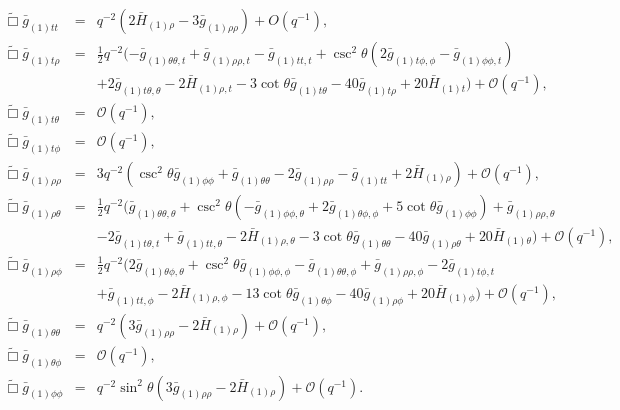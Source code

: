 \documentclass[aps,letterpaper,twocolumn,nofootinbib]{revtex4}
\numberwithin{equation}{section}
\begin{document}
\begin{widetext}
\begin{eqnarray}\label{eqn:efett_3p1}
\tilde{\Box}\bar{g}_{(1)tt}&=&q^{-2} \left(2 \bar{H}_{(1) \rho }-3 \bar{g}_{(1) \rho \rho }\right)+O\left(q^{-1}\right),\\
%
\label{eqn:efetrho_3p1}
\tilde{\Box}\bar{g}_{(1)t\rho}&=&\frac{1}{2}q^{-2} (-\bar{g}_{(1)\theta \theta,t}+\bar{g}_{(1) \rho \rho ,t}-\bar{g}_{(1)
  \text{$tt$},t}+\csc ^2\theta \left(2 \bar{g}_{(1) \text{$t$$\phi $},\phi }-\bar{g}_{(1)
  \phi \phi ,t}\right) \nonumber\\
   &&+2 \bar{g}_{(1) \text{$t$$\theta $},\theta }-2 \bar{H}_{(1) \rho ,t}-3
   \cot \theta  \bar{g}_{(1) \text{$t$$\theta $}}-40 \bar{g}_{(1) \text{$t$$\rho $}}+20
   \bar{H}_{(1) t}) +\mathcal{O}(q^{-1}),\\
%
\label{eqn:efettheta_3p1}
\tilde{\Box}\bar{g}_{(1)t\theta}&=&\mathcal{O}(q^{-1}),\\
%
\label{eqn:efetphi_3p1}
\tilde{\Box}\bar{g}_{(1)t\phi}&=&\mathcal{O}(q^{-1}),\\
%
\label{eqn:eferhorho_3p1}
\tilde{\Box}\bar{g}_{(1)\rho\rho}&=&3q^{-2} \left(\csc ^2\theta \bar{g}_{(1) \phi \phi }+\bar{g}_{(1)\theta \theta}-2 \bar{g}_{(1)
   \rho \rho }-\bar{g}_{(1) \text{$tt$}}+2 \bar{H}_{(1) \rho }\right)+\mathcal{O}(q^{-1}),\\
% 
\label{eqn:eferhotheta_3p1}
\tilde{\Box}\bar{g}_{(1)\rho\theta}&=&\frac{1}{2} q^{-2}(\bar{g}_{(1)\theta \theta,\theta }+\csc ^2\theta \left(-\bar{g}_{(1)
   \phi \phi ,\theta }+2 \bar{g}_{(1)\theta \phi,\phi }+5 \cot \theta  \bar{g}_{(1) \phi
   \phi }\right)+\bar{g}_{(1) \rho \rho ,\theta }\nonumber\\
   &&-2 \bar{g}_{(1) \text{$t$$\theta
   $},t}+\bar{g}_{(1) \text{$tt$},\theta }-2 \bar{H}_{(1) \rho ,\theta }-3 \cot \theta 
   \bar{g}_{(1)\theta \theta}-40 \bar{g}_{(1) \rho \theta }+20 \bar{H}_{(1)\theta})+\mathcal{O}(q^{-1}),\\
% 
\label{eqn:eferhophi_3p1}
\tilde{\Box}\bar{g}_{(1)\rho\phi}&=&\frac{1}{2} q^{-2}(2 \bar{g}_{(1)\theta \phi,\theta }+\csc ^2\theta \bar{g}_{(1) \phi
   \phi ,\phi }-\bar{g}_{(1)\theta \theta,\phi }+\bar{g}_{(1) \rho \rho ,\phi }-2
   \bar{g}_{(1) \text{$t$$\phi $},t}\nonumber\\
   &&+\bar{g}_{(1) \text{$tt$},\phi }-2 \bar{H}_{(1) \rho ,\phi }-13
   \cot \theta  \bar{g}_{(1)\theta \phi}-40 \bar{g}_{(1) \rho \phi }+20 \bar{H}_{(1) \phi
   })+\mathcal{O}(q^{-1}),\\
%
\label{eqn:efethetatheta_3p1}
\tilde{\Box}\bar{g}_{(1)\theta\theta}&=&q^{-2}  \left(3 \bar{g}_{(1) \rho \rho }-2 \bar{H}_{(1) \rho }\right)+\mathcal{O}(q^{-1}),\\
%
\label{eqn:efethetaphi_3p1}
\tilde{\Box}\bar{g}_{(1)\theta\phi}&=&\mathcal{O}(q^{-1}),\\
%
\label{eqn:efephiphi_3p1}
\tilde{\Box}\bar{g}_{(1)\phi\phi}&=&q^{-2}  \sin^2\theta\left(3 \bar{g}_{(1) \rho \rho }-2 \bar{H}_{(1) \rho }\right)+\mathcal{O}(q^{-1}).
\end{eqnarray}
\end{widetext}
\end{document}
